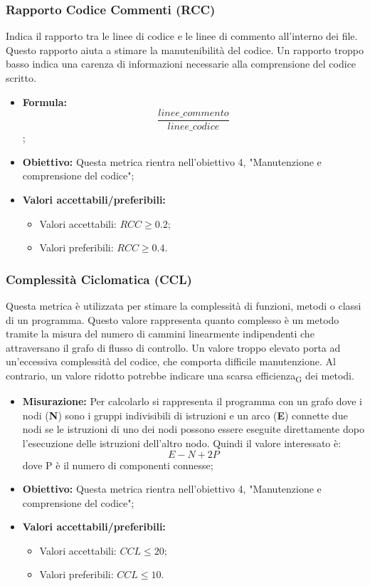 \subsubsection{Rapporto Codice Commenti (RCC)}
Indica il rapporto tra le linee di codice e le linee di commento all'interno dei file. Questo rapporto aiuta a stimare la manutenibilità del codice. Un rapporto troppo basso indica una carenza di informazioni necessarie alla comprensione del codice scritto.
\begin{itemize}
	\item \textbf{Formula:} \[\frac{linee\_commento}{linee\_codice}\];
	\item \textbf{Obiettivo:} Questa metrica rientra nell'obiettivo 4, "Manutenzione e comprensione del codice";
	\item \textbf{Valori accettabili/preferibili: }
	\begin{itemize}
		\item Valori accettabili: $RCC \geq 0.2$;
		\item Valori preferibili: $RCC \geq 0.4$.
	\end{itemize}
\end{itemize}


\subsubsection{Complessità Ciclomatica (CCL)}
Questa metrica è utilizzata per stimare la complessità di funzioni, metodi o classi di un programma. Questo valore rappresenta quanto complesso è un metodo tramite la misura del numero di cammini linearmente indipendenti che attraversano il grafo di flusso di controllo. Un valore troppo elevato porta ad un'eccessiva complessità del codice, che comporta difficile manutenzione. Al contrario, un valore ridotto potrebbe indicare una scarsa efficienza\textsubscript{G} dei metodi.
\begin{itemize}
	\item \textbf{Misurazione:}  Per calcolarlo si rappresenta il programma con un grafo dove i  nodi (\textbf{N}) sono i gruppi indivisibili di istruzioni e un arco (\textbf{E}) connette due nodi se le istruzioni di uno dei nodi possono essere eseguite direttamente dopo l'esecuzione delle istruzioni dell'altro nodo. Quindi il valore interessato è:
	\[E-N+2P\]
	dove P è il numero di componenti connesse;
	\item \textbf{Obiettivo:} Questa metrica rientra nell'obiettivo 4, "Manutenzione e comprensione del codice";
	\item \textbf{Valori accettabili/preferibili: }
	\begin{itemize}
		\item Valori accettabili: $CCL \leq 20$;
		\item Valori preferibili: $CCL \leq 10$.
	\end{itemize}
\end{itemize}
